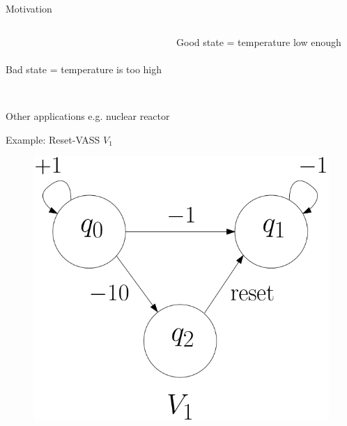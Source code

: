 \documentclass{beamer}
\begin{document}
\begin{frame}{Motivation}
\begin{columns}[T]
\phantom{Fridge.png} \\
\phantom{Fridge.png} \\
{\sf Bad} state = temperature is too high \newline

 {\sf Good} state = temperature low enough \\

\end{columns}

\pause

\phantom{Fridge.png} \\
Other applications e.g.  nuclear reactor 

  \end{frame}
  \begin{frame}{Example: Reset-VASS $V_1$}
  
  
   \begin{center}
 	\begin{figure}
 	\vspace{.06cm}
\includegraphics[width=.50\textwidth]{FigA}
	\end{figure}
\end{center}  

  \end{frame}
\end{document}

